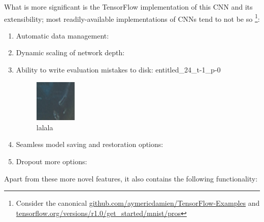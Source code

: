 \documentclass[a4paper, 11pt]{article} %
\begin{document}
	\hspace*{-6mm}What is more significant is the TensorFlow implementation of 
	this CNN and its
	extensibility; most readily-available implementations of CNNs tend to not 
	be so \footnote{Consider the canonical
	\hyperlink{https://github.com/aymericdamien/TensorFlow-Examples}
	{github.com/aymericdamien/TensorFlow-Examples} and 
	\hyperlink{https://www.tensorflow.org/versions/r1.0/get\_started/mnist/pros}
	{tensorflow.org/versions/r1.0/get\_started/mnist/pros}}:
	\begin{enumerate}
		\item Automatic data management:
		\item Dynamic scaling of network depth:
		\item Ability to write evaluation mistakes to disk: 
		entitled\_24\_t-1\_p-0
		\begin{figure}[H]
			\centering
			\includegraphics[width=2cm]{figures/mistake_example}
			\caption{lalala}
		\end{figure}
		\item Seamless model saving and restoration options:
		\item Dropout more options: \cite{dropout}\relax 
	\end{enumerate}
	Apart from these more novel features, it also contains the following 
	functionality:
\end{document}

